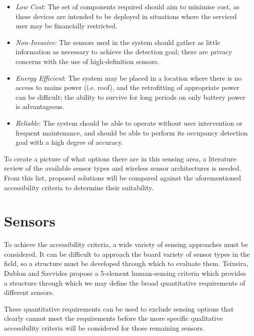 \documentclass[../thesis/thesis.tex]{subfiles}
\begin{document}
\begin{itemize}
 \item \emph{Low Cost}: The set of components required should aim to minimise cost, as these devices are intended to be deployed in situations where the serviced user may be financially restricted.
 
 \item \emph{Non-Invasive}: The sensors used in the system should gather as little information as necessary to achieve the detection goal; there are privacy concerns with the use of high-definition sensors.
 
 \item \emph{Energy Efficient}: The system may be placed in a location where there is no access to mains power (i.e. roof), and the retrofitting of appropriate power can be difficult; the ability to survive for long periods on only battery power is advantageous.
 
 \item \emph{Reliable}: The system should be able to operate without user intervention or frequent maintenance, and should be able to perform its occupancy detection goal with a high degree of accuracy.
\end{itemize}

To create a picture of what options there are in this sensing area, a literature review of the available sensor types and wireless sensor architectures is needed. From this list, proposed solutions will be compared against the aforementioned accessibility criteria to determine their suitability.

\section{Sensors}
\label{sec:litreview:sensors}

To achieve the accessibility criteria, a wide variety of sensing approaches must be considered. It can be difficult to approach the board variety of sensor types in the field, so a structure must be developed through which to evaluate them. Teixeira, Dublon and Savvides \cite{teixeira2010survey} propose a 5-element human-sensing criteria which provides a structure through which we may define the broad quantitative requirements of different sensors.

These quantitative requirements can be used to exclude sensing options that clearly cannot meet the requirements before the more specific qualitative accessibility criteria will be considered for those remaining sensors. 
\end{document}
